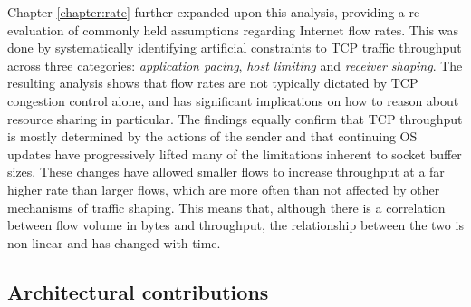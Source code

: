 Chapter \ref{chapter:rate} further expanded upon this analysis, providing a re-evaluation of commonly held assumptions regarding Internet flow rates.
This was done by systematically identifying artificial constraints to \ac{TCP} traffic throughput across three categories: \emph{application pacing}, \emph{host limiting} and \emph{receiver shaping}. 
The resulting analysis shows that flow rates are not typically dictated by \ac{TCP} congestion control alone, and has significant implications on how to reason about resource sharing in particular.
The findings equally confirm that \ac{TCP} throughput is mostly determined by the actions of the sender and that continuing \acl{OS} updates have progressively lifted many of the limitations inherent to socket buffer sizes. 
These changes have allowed smaller flows to increase throughput at a far higher rate than larger flows, which are more often than not affected by other mechanisms of traffic shaping.
This means that, although there is a correlation between flow volume in bytes and throughput, the relationship between the two is non-linear and has changed with time.

\subsection{Architectural contributions}


%

